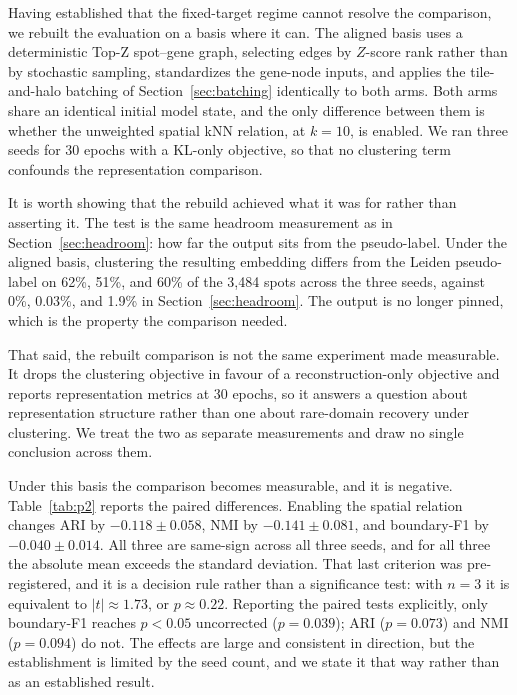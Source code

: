 \documentclass[twocolumn,10pt]{article}
\begin{document}
Having established that the fixed-target regime cannot resolve the comparison, we rebuilt the evaluation on a basis where it can. The aligned basis uses a deterministic Top-Z spot--gene graph, selecting edges by $Z$-score rank rather than by stochastic sampling, standardizes the gene-node inputs, and applies the tile-and-halo batching of Section~\ref{sec:batching} identically to both arms. Both arms share an identical initial model state, and the only difference between them is whether the unweighted spatial kNN relation, at $k = 10$, is enabled. We ran three seeds for 30 epochs with a KL-only objective, so that no clustering term confounds the representation comparison.

It is worth showing that the rebuild achieved what it was for rather than asserting it. The test is the same headroom measurement as in Section~\ref{sec:headroom}: how far the output sits from the pseudo-label. Under the aligned basis, clustering the resulting embedding differs from the Leiden pseudo-label on 62\%, 51\%, and 60\% of the 3{,}484 spots across the three seeds, against 0\%, 0.03\%, and 1.9\% in Section~\ref{sec:headroom}. The output is no longer pinned, which is the property the comparison needed.

That said, the rebuilt comparison is not the same experiment made measurable. It drops the clustering objective in favour of a reconstruction-only objective and reports representation metrics at 30 epochs, so it answers a question about representation structure rather than one about rare-domain recovery under clustering. We treat the two as separate measurements and draw no single conclusion across them.

Under this basis the comparison becomes measurable, and it is negative. Table~\ref{tab:p2} reports the paired differences. Enabling the spatial relation changes ARI by $-0.118 \pm 0.058$, NMI by $-0.141 \pm 0.081$, and boundary-F1 by $-0.040 \pm 0.014$. All three are same-sign across all three seeds, and for all three the absolute mean exceeds the standard deviation. That last criterion was pre-registered, and it is a decision rule rather than a significance test: with $n = 3$ it is equivalent to $|t| \approx 1.73$, or $p \approx 0.22$. Reporting the paired tests explicitly, only boundary-F1 reaches $p < 0.05$ uncorrected ($p = 0.039$); ARI ($p = 0.073$) and NMI ($p = 0.094$) do not. The effects are large and consistent in direction, but the establishment is limited by the seed count, and we state it that way rather than as an established result.
\end{document}
